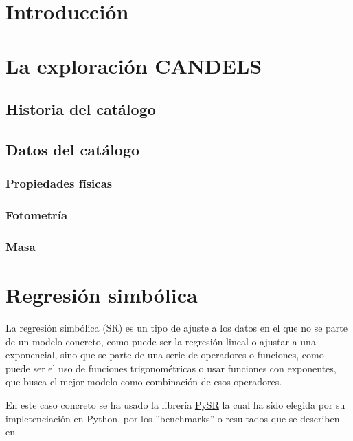 \documentclass[11pt, a4paper]{article} %
\begin{document}

\newpage

\tableofcontents


\section{Introducción}
\section{La exploración CANDELS}
\subsection{Historia del catálogo}
\subsection{Datos del catálogo}
\subsubsection{Propiedades físicas}
\subsubsection{Fotometría}
\subsubsection{Masa}
\section{Regresión simbólica}
La regresión simbólica (SR) es un tipo de ajuste a los datos en el que no se parte de un 
modelo concreto, como puede ser la regresión lineal o ajustar a una exponencial, sino que 
se parte de una serie de operadores o funciones, como puede ser el uso de funciones trigonométricas 
o usar funciones con exponentes, que busca el mejor modelo como combinación de esos operadores.  

En este caso concreto se ha usado la librería \href{https://github.com/MilesCranmer/PySR}{PySR} la cual
ha sido elegida por su impletenciación en Python, por los ''benchmarks''  o resultados que 
se describen en \cite{cranmerInterpretableMachineLearning2023}
\end{document}
